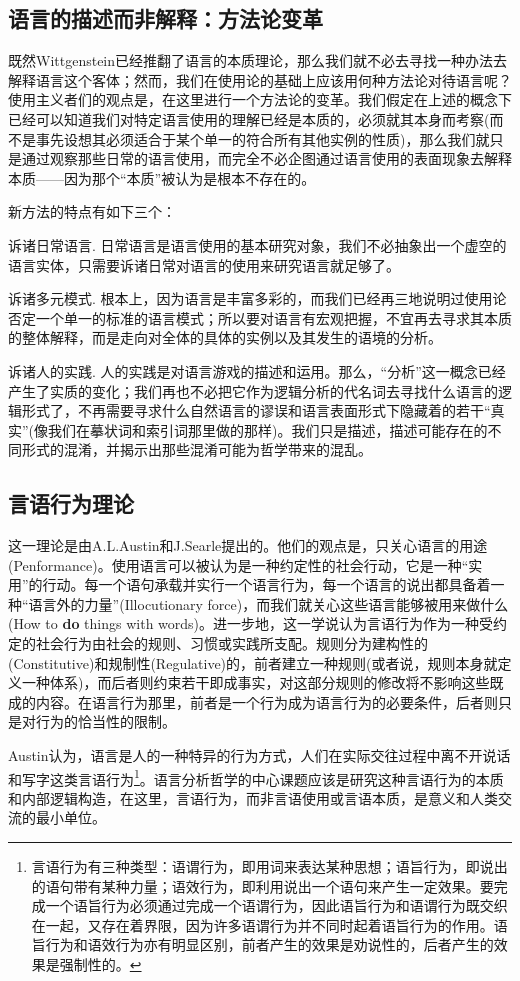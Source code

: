 \documentclass{article}
\begin{document}
\subsection{语言的描述而非解释：方法论变革}
既然Wittgenstein已经推翻了语言的本质理论，那么我们就不必去寻找一种办法去解释语言这个客体；然而，我们在使用论的基础上应该用何种方法论对待语言呢？使用主义者们的观点是，在这里进行一个方法论的变革。我们假定在上述的概念下已经可以知道我们对特定语言使用的理解已经是本质的，必须就其本身而考察(而不是事先设想其必须适合于某个单一的符合所有其他实例的性质)，那么我们就只是通过观察那些日常的语言使用，而完全不必企图通过语言使用的表面现象去解释本质——因为那个“本质”被认为是根本不存在的。

新方法的特点有如下三个：

{\heiti 诉诸日常语言.}
日常语言是语言使用的基本研究对象，我们不必抽象出一个虚空的语言实体，只需要诉诸日常对语言的使用来研究语言就足够了。

{\heiti 诉诸多元模式.}
根本上，因为语言是丰富多彩的，而我们已经再三地说明过使用论否定一个单一的标准的语言模式；所以要对语言有宏观把握，不宜再去寻求其本质的整体解释，而是走向对全体的具体的实例以及其发生的语境的分析。

{\heiti 诉诸人的实践.}
人的实践是对语言游戏的描述和运用。那么，“分析”这一概念已经产生了实质的变化；我们再也不必把它作为逻辑分析的代名词去寻找什么语言的逻辑形式了，不再需要寻求什么自然语言的谬误和语言表面形式下隐藏着的若干“真实”(像我们在摹状词和索引词那里做的那样)。我们只是描述，描述可能存在的不同形式的混淆，并揭示出那些混淆可能为哲学带来的混乱。
\subsection{言语行为理论}
这一理论是由A.L.Austin和J.Searle提出的。他们的观点是，只关心语言的用途(Penformance)。使用语言可以被认为是一种约定性的社会行动，它是一种“实用”的行动。每一个语句承载并实行一个语言行为，每一个语言的说出都具备着一种“语言外的力量”(Illocutionary force)，而我们就关心这些语言能够被用来做什么(How to \textbf{do} things with words)。进一步地，这一学说认为言语行为作为一种受约定的社会行为由社会的规则、习惯或实践所支配。规则分为建构性的(Constitutive)和规制性(Regulative)的，前者建立一种规则(或者说，规则本身就定义一种体系)，而后者则约束若干即成事实，对这部分规则的修改将不影响这些既成的内容。在语言行为那里，前者是一个行为成为语言行为的必要条件，后者则只是对行为的恰当性的限制。

Austin认为，语言是人的一种特异的行为方式，人们在实际交往过程中离不开说话和写字这类言语行为\footnote{言语行为有三种类型：语谓行为，即用词来表达某种思想；语旨行为，即说出的语句带有某种力量；语效行为，即利用说出一个语句来产生一定效果。要完成一个语旨行为必须通过完成一个语谓行为，因此语旨行为和语谓行为既交织在一起，又存在着界限，因为许多语谓行为并不同时起着语旨行为的作用。语旨行为和语效行为亦有明显区别，前者产生的效果是劝说性的，后者产生的效果是强制性的。}。语言分析哲学的中心课题应该是研究这种言语行为的本质和内部逻辑构造，在这里，言语行为，而非言语使用或言语本质，是意义和人类交流的最小单位。
\end{document}
